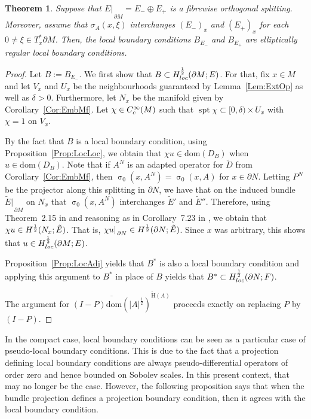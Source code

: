 \documentclass[a4paper,10pt,reqno]{amsart}
\newcommand{\sym}{\upsigma}
\newcommand{\rest}[1]{{{\lvert_{}}_{}}_{#1}}
\newcommand{\modulus}[1]{|#1|}
\newcommand{\Ck}[2][{}]{{\rm C}^{#2}_{\rm #1}}%
\newcommand{\Hard}[2][{}]{{\rm H}^{#2}_{\rm #1}}%
\newcommand{\SobH}[2][{}]{\Hard[#1]{\rm #2}}
\newcommand{\checkH}{\check{\mathrm{H}}}
\newcommand{\dom}{\mathrm{dom}}
\newcommand{\close}[1]{\overline{#1}}
\DeclareMathOperator{\spt}{spt}%
\newcommand{\dM}{\partial M}
\newtheorem{theorem}{Theorem}[section]
\theoremstyle{definition}
\begin{document}
\begin{theorem}
\label{Thm:LocEllReg}
Suppose that $E\rest{\dM} = E_- \oplus E_+$ is a fibrewise orthogonal splitting.
Moreover, assume that $\sigma_A(x,\xi)$ interchanges $(E_-)_x$ and $(E_+)_x$ for each $0 \neq \xi \in T^\ast_x \dM$.
Then, the local boundary conditions $B_{E_-}$ and $B_{E_+}$ are elliptically regular local boundary conditions.
\end{theorem}
\begin{proof}
Let $B := B_{E_-}$.
We first show that $B \subset \SobH[loc]{\frac12}(\dM;E)$.
For that, fix $x\in M$ and let $V_x$ and $U_x$ be the neighbourhoods guaranteed by Lemma~\ref{Lem:ExtOp} as well as $\delta > 0$.
Furthermore, let  $N_x$ be the manifold given by Corollary~\ref{Cor:EmbMf}.
Let $\chi \in \Ck[c]{\infty}(M)$ such that $\spt \chi \subset [0, \delta) \times U_x$ with $\chi = 1$ on $V_x$.

By the fact that $B$ is a local boundary condition, using Proposition~\ref{Prop:LocLoc}, we obtain that $\chi u \in \dom(D_B)$ when $u \in \dom(D_B)$.
Note that if $A^N$ is an adapted operator for $\tilde{D}$ from Corollary~\ref{Cor:EmbMf}, then $\sym_0(x, A^N) = \sym_0(x,A)$ for $x \in \partial N$.
Letting $P^N$ be the projector along this splitting in $\partial N$, we have that on the  induced bundle $\tilde{E}\rest{\dM}$ on $N_x$ that $\sym_0(x,A^N)$ interchanges $\tilde{E}'$ and $\tilde{E}''$.
Therefore, using Theorem~2.15 in \cite{BBan} and reasoning as in Corollary~7.23 in \cite{BB12}, we obtain that $\chi u \in \SobH{\frac12}(N_x;\tilde{E})$.
That is, $\chi u\rest{\partial N} \in \SobH{\frac12}(\partial N;\tilde{E})$.
Since $x$ was arbitrary, this shows that $u \in \SobH[loc]{\frac12}(\dM;E)$.

Proposition~\ref{Prop:LocAdj} yields that  $B^\ast$ is also a local boundary condition and applying this argument to $B^\ast$ in  place of $B$ yields that $B^\ast \subset \SobH[loc]{\frac12}(\partial N;F)$.

The argument for $\close{(I -P)\dom(\modulus{A}^{\frac12})}^{\checkH(A)}$  proceeds exactly on replacing $P$ by $(I-P)$.
\end{proof}


In the compact case, local boundary conditions can be seen as a particular case of pseudo-local boundary conditions.
This is due to the fact that a projection defining local boundary conditions are always pseudo-differential operators of order zero and hence bounded on Sobolev scales.
In this present context, that may no longer be the case.
However, the following proposition says that when the bundle projection defines a projection boundary condition, then it agrees with the local boundary condition.
\end{document}
